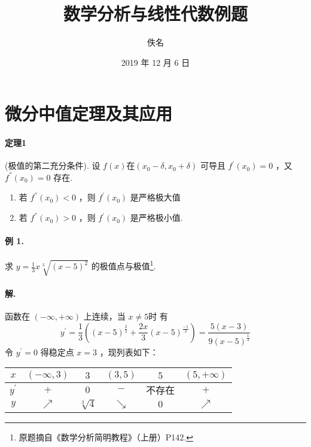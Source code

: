 \documentclass[UTF8]{ctexart}
\title{数学分析与线性代数例题}
\author{佚名}
\date{2019 年 12 月 6 日}
\begin{document}
\maketitle
\tableofcontents

\section{微分中值定理及其应用}

\paragraph{定理1}(极值的第二充分条件). 设 $f(x)$在$(x_0-\delta,x_0+\delta)$ 可导且 
$f^{'}(x_0)=0$ ，又 $f^{''}(x_0)=0$ 存在.
\begin{enumerate}[1)]
\setlength{\itemindent}{1em}
    \item 若 $f^{''}(x_0)<0$ ，则 $f^{'}(x_0)$ 是严格极大值
    \item 若 $f^{''}(x_0)>0$ ，则 $f^{'}(x_0)$ 是严格极小值.
\end{enumerate}

\paragraph{例 1.}求 $y=\frac{1}{3}x\sqrt[3]{(x-5)^2}$ 的极值点与极值\footnote{原题摘自《数学分析简明教程》（上册）P142.}.
\paragraph{解.}函数在 $(-\infty,+\infty)$ 上连续，当 $x\not=5时$ 有
\begin{equation}
    y^{'}=\frac{1}{3}\left(\left(x-5\right)^\frac{2}{3}+\frac{2x}{3}\left(x-5\right)^\frac{-1}{3}\right)=\frac{5\left(x-3\right)}{9\left(x-5\right)^\frac{1}{3}}
\end{equation}
令 $y^{'}=0$ 得稳定点 $x=3$ ，现列表如下：
\begin{table}[H]
    \centering
    \begin{tabular}{|c|c|c|c|c|c|}
            \hline
        $x$ &$(-\infty,3)$ &$3$ &$(3,5)$ &$5$ &$(5,+\infty)$\\
            \hline
        $y^{'}$ &$+$ &$0$ &$-$ &$不存在$ &$+$\\
            \hline
        $y$ &$\nearrow$ &$\sqrt[3]{4}$ &$\searrow$ &$0$ &$\nearrow$\\
            \hline
    \end{tabular}  
    \label{tab1}
\end{table}
\end{document}
